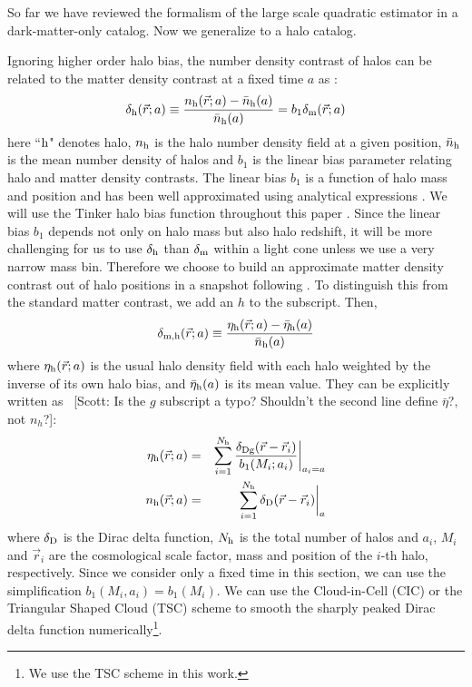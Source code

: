 \documentclass[prd,amsmath,amssymb,floatfix,superscriptaddress,nofootinbib,twocolumn]{revtex4-1}
\def\be{\begin{equation}}
\def\ee{\end{equation}}
\def\bea{\begin{eqnarray}}
\def\eea{\end{eqnarray}}
\newcommand{\vrr}{\vec{r}}
\newcommand{\eql}[1]{\label{eq:#1}}
\newcommand{\scott}[1]{{\color{darkgreen} \, [Scott: #1]}}
\newcommand\dmh{\delta_{\rm m,h}}
\begin{document}
So far we have reviewed the formalism of the large scale quadratic estimator in a dark-matter-only catalog. Now we generalize to a halo catalog.

Ignoring higher order halo bias, the number density contrast of halos can be related to the matter density contrast at a fixed time $a$ as \cite{Desjacques:2018rev}:
\be 
\delta_{\rm h}(\vrr;a) \equiv \frac{n_{\rm h}(\vrr;a)-\bar{n}_{\rm h}(a)}{\bar{n}_{\rm h}(a)}=b_{1}\delta_{\rm m}(\vrr;a) \eql{hdc}
\ee 
here ``$\rm h$" denotes halo, $n_{\rm h}$ is the halo number density field at a given position, $\bar{n}_{\rm h}$ is the mean number density of halos and $b_{1}$ is the linear bias parameter relating halo and matter density contrasts. The linear bias $b_{1}$ is a function of halo mass and position and has been well approximated using analytical expressions \cite{Seljak:2004SW}\cite{Bhattacharya:2011MF}. We will use the Tinker halo bias function throughout this paper \cite{Tinker:2010Tinker}. Since the linear bias $b_1$ depends not only on halo mass but also halo redshift, it will be more challenging for us to use $\delta_{\rm h}$ than $\delta_{\rm m}$ within a light cone unless we use a very narrow mass bin. Therefore we choose to build an approximate matter density contrast out of halo positions in a snapshot following \cite{Pervical:2007GPS}. To distinguish this from the standard matter contrast, we add an $h$ to the subscript. Then,
\be 
\dmh(\vrr;a) \equiv \frac{\eta_{\rm h}(\vrr;a)-\bar{\eta}_{\rm h}(a)}{\bar{n}_{\rm h}(a)} \eql{hm}
\ee 
where $\eta_{\rm h}(\vrr;a)$ is the usual halo density field with each halo weighted by the inverse of its own halo bias, and $\bar{\eta}_{\rm h}(a)$ is its mean value. They can be explicitly written as\scott{Is the $g$ subscript a typo? Shouldn't the second line define $\bar\eta$?, not $n_h$?}:
\bea
\eta_{\rm h}(\vrr;a)&=&\sum_{i=1}^{N_{\rm h}}\frac{\delta_{\rm D g}(\vrr-\vrr_{i})}{b_{1}(M_{i};a_{i})}\bigg|_{a_{i}=a} \eql{nob}\\
n_{\rm h}(\vrr;a)&=&\sum_{i=1}^{N_{\rm h}}\delta_{\rm D}(\vrr-\vrr_{i})\bigg|_{a}
\eea
where $\delta_{\rm D}$ is the Dirac delta function, $N_{\rm h}$ is the total number of halos and $a_{i}$, $M_{i}$ and $\vrr_{i}$ are the cosmological scale factor, mass and position of the $i$-th halo, respectively. Since we consider only a fixed time in this section, we can use the simplification $b_{1}(M_{i},a_{i})=b_{1}(M_i)$. We can use the Cloud-in-Cell (CIC) or the Triangular Shaped Cloud (TSC) scheme \cite{Sefusatti:2015CIC} to smooth the sharply peaked Dirac delta function numerically\footnote{We use the TSC scheme in this work.}.
\end{document}

